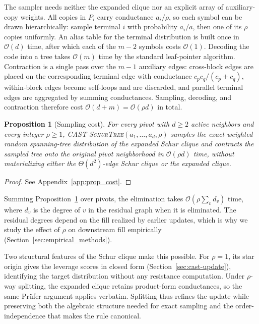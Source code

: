 \documentclass{article}
\newcommand{\calO}{\mathcal{O}}
\newcommand{\bigO}{\calO}
\newcommand{\1}{\mathbbm{1}}
\theoremstyle{plain}
\newtheorem{proposition}[theorem]{Proposition}
\begin{document}
The sampler needs neither the expanded clique nor an explicit array of
auxiliary-copy weights. All copies in $P_i$ carry conductance
$a_i/\rho$, so each symbol can be drawn hierarchically: sample terminal
$i$ with probability $a_i/a$, then one of its $\rho$ copies uniformly.
An alias table for the terminal distribution is built once in
$\bigO(d)$ time, after which each of the $m-2$ symbols costs
$\bigO(1)$. Decoding the code into a tree takes $\bigO(m)$ time by the
standard leaf-pointer algorithm. Contraction is a single pass over the
$m-1$ auxiliary edges: cross-block edges are placed on the
corresponding terminal edge with conductance $c_pc_q/(c_p+c_q)$,
within-block edges become self-loops and are discarded, and parallel
terminal edges are aggregated by summing conductances. Sampling,
decoding, and contraction therefore cost
$\bigO(d+m)=\bigO(\rho d)$ in total.

\begin{proposition}[Sampling cost]
\label{prop:cost}
For every pivot with $d\geq 2$ active neighbors and every integer
$\rho\geq 1$, \textsc{CAST-SchurTree}$(a_1,\ldots,a_d,\rho)$
samples the exact weighted random spanning-tree distribution of the
expanded Schur clique and contracts the sampled tree onto the original
pivot neighborhood in $\bigO(\rho d)$ time, without materializing
either the $\Theta(d^2)$-edge Schur clique or the expanded clique.
\end{proposition}

\begin{proof}
    See Appendix~\ref{app:prop_cost}.
\end{proof}

Summing Proposition~\ref{prop:cost} over pivots, the elimination takes 
$\bigO\!\left(\rho\sum_v d_v\right)$ time, where $d_v$ is the degree of
$v$ in the residual graph when it is eliminated. The residual degrees
depend on the fill realized by earlier updates, which is why we study
the effect of $\rho$ on downstream fill empirically
(Section~\ref{sec:empirical_methods}).

Two structural features of the Schur clique make this possible. For
$\rho=1$, its star origin gives the leverage scores in closed form
(Section~\ref{sec:cast-update}), identifying the target distribution
without any resistance computation. Under $\rho$-way splitting, the
expanded clique retains product-form conductances, so the same
Pr\"ufer argument applies verbatim. Splitting thus refines the update while preserving both the algebraic structure needed for exact
sampling and the order-independence that makes the rule canonical.
\end{document}
